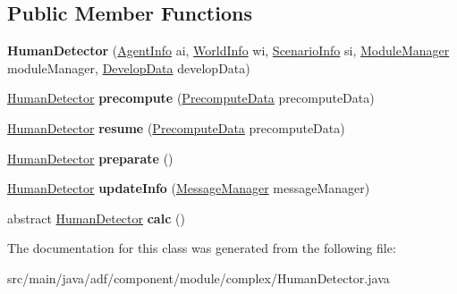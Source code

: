 \subsection*{Public Member Functions}
\begin{DoxyCompactItemize}
\item 
\hypertarget{classadf_1_1component_1_1module_1_1complex_1_1HumanDetector_a2fa3bdb5a88a7d55effd8d52456bfe10}{}\label{classadf_1_1component_1_1module_1_1complex_1_1HumanDetector_a2fa3bdb5a88a7d55effd8d52456bfe10} 
{\bfseries Human\+Detector} (\hyperlink{classadf_1_1agent_1_1info_1_1AgentInfo}{Agent\+Info} ai, \hyperlink{classadf_1_1agent_1_1info_1_1WorldInfo}{World\+Info} wi, \hyperlink{classadf_1_1agent_1_1info_1_1ScenarioInfo}{Scenario\+Info} si, \hyperlink{classadf_1_1agent_1_1module_1_1ModuleManager}{Module\+Manager} module\+Manager, \hyperlink{classadf_1_1agent_1_1develop_1_1DevelopData}{Develop\+Data} develop\+Data)
\item 
\hypertarget{classadf_1_1component_1_1module_1_1complex_1_1HumanDetector_ab47c656ca788a903f142c7acaf437d9a}{}\label{classadf_1_1component_1_1module_1_1complex_1_1HumanDetector_ab47c656ca788a903f142c7acaf437d9a} 
\hyperlink{classadf_1_1component_1_1module_1_1complex_1_1HumanDetector}{Human\+Detector} {\bfseries precompute} (\hyperlink{classadf_1_1agent_1_1precompute_1_1PrecomputeData}{Precompute\+Data} precompute\+Data)
\item 
\hypertarget{classadf_1_1component_1_1module_1_1complex_1_1HumanDetector_a0deb5c736dac813b9a571688e1218e69}{}\label{classadf_1_1component_1_1module_1_1complex_1_1HumanDetector_a0deb5c736dac813b9a571688e1218e69} 
\hyperlink{classadf_1_1component_1_1module_1_1complex_1_1HumanDetector}{Human\+Detector} {\bfseries resume} (\hyperlink{classadf_1_1agent_1_1precompute_1_1PrecomputeData}{Precompute\+Data} precompute\+Data)
\item 
\hypertarget{classadf_1_1component_1_1module_1_1complex_1_1HumanDetector_aea55da5c1b5dda0fff0d44b75338d43e}{}\label{classadf_1_1component_1_1module_1_1complex_1_1HumanDetector_aea55da5c1b5dda0fff0d44b75338d43e} 
\hyperlink{classadf_1_1component_1_1module_1_1complex_1_1HumanDetector}{Human\+Detector} {\bfseries preparate} ()
\item 
\hypertarget{classadf_1_1component_1_1module_1_1complex_1_1HumanDetector_aa55c3e8f4333ac8b4ce854e72e1f21e5}{}\label{classadf_1_1component_1_1module_1_1complex_1_1HumanDetector_aa55c3e8f4333ac8b4ce854e72e1f21e5} 
\hyperlink{classadf_1_1component_1_1module_1_1complex_1_1HumanDetector}{Human\+Detector} {\bfseries update\+Info} (\hyperlink{classadf_1_1agent_1_1communication_1_1MessageManager}{Message\+Manager} message\+Manager)
\item 
\hypertarget{classadf_1_1component_1_1module_1_1complex_1_1HumanDetector_adf87547c196640d7d7f12599aff53841}{}\label{classadf_1_1component_1_1module_1_1complex_1_1HumanDetector_adf87547c196640d7d7f12599aff53841} 
abstract \hyperlink{classadf_1_1component_1_1module_1_1complex_1_1HumanDetector}{Human\+Detector} {\bfseries calc} ()
\end{DoxyCompactItemize}


The documentation for this class was generated from the following file\+:\begin{DoxyCompactItemize}
\item 
src/main/java/adf/component/module/complex/Human\+Detector.\+java\end{DoxyCompactItemize}
